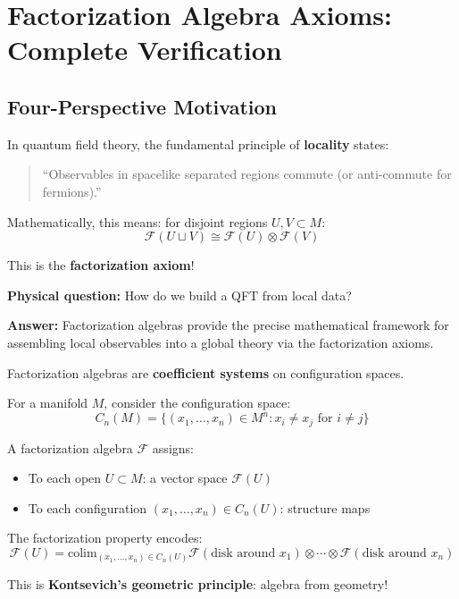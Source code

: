 \section{Factorization Algebra Axioms: Complete Verification}
\label{sec:factorization-axioms-complete}

\subsection{Four-Perspective Motivation}

\begin{motivation}
In quantum field theory, the fundamental principle of \textbf{locality} states:
\begin{quote}
``Observables in spacelike separated regions commute (or anti-commute for fermions).''
\end{quote}

Mathematically, this means: for disjoint regions $U, V \subset M$:
$$\mathcal{F}(U \sqcup V) \cong \mathcal{F}(U) \otimes \mathcal{F}(V)$$

This is the \textbf{factorization axiom}!

\textbf{Physical question:} How do we build a QFT from local data?

\textbf{Answer:} Factorization algebras provide the precise mathematical framework 
for assembling local observables into a global theory via the factorization axioms.
\end{motivation}

\begin{construction}
Factorization algebras are \textbf{coefficient systems} on configuration spaces.

For a manifold $M$, consider the configuration space:
$$C_n(M) = \{(x_1, \ldots, x_n) \in M^n : x_i \neq x_j \text{ for } i \neq j\}$$

A factorization algebra $\mathcal{F}$ assigns:
\begin{itemize}
\item To each open $U \subset M$: a vector space $\mathcal{F}(U)$
\item To each configuration $(x_1, \ldots, x_n) \in C_n(U)$: structure maps
\end{itemize}

The factorization property encodes:
$$\mathcal{F}(U)= \text{colim}_{(x_1,\ldots,x_n) \in C_n(U)} 
   \mathcal{F}(\text{disk around } x_1) \otimes \cdots \otimes 
   \mathcal{F}(\text{disk around } x_n)$$

This is \textbf{Kontsevich's geometric principle}: algebra from geometry!
\end{construction}

